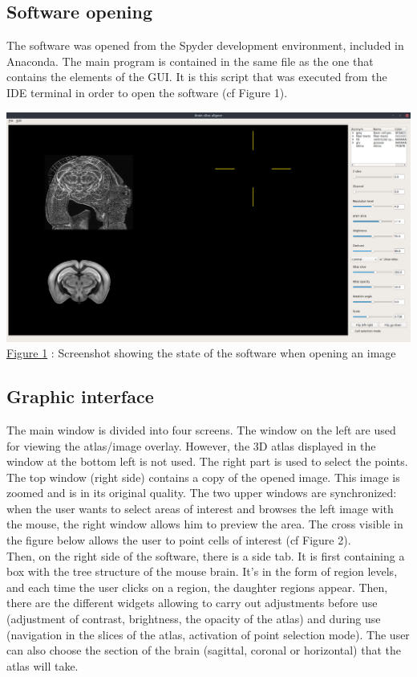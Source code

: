 \documentclass[a4paper,12pt]{report}
\begin{document}
\subsection{Software opening}
The software was opened from the Spyder development environment, included in Anaconda. The main program is contained in the same file as the one that contains the elements of the GUI. It is this script that was executed from the IDE terminal in order to open the software (cf Figure 1). 

\begin{center} \includegraphics[scale=0.25]{oldWhenOpenImage.png}\\
\underline{Figure 1} : Screenshot showing the state of the software when opening an image \\ \vspace{1\baselineskip} \end{center}

\subsection{Graphic interface}
The main window is divided into four screens. The window on the left are used for viewing the atlas/image overlay. However, the 3D atlas displayed in the window at the bottom left is not used. The right part is used to select the points. The top window (right side) contains a copy of the opened image. This image is zoomed and is in its original quality. The two upper windows are synchronized: when the user wants to select areas of interest and browses the left image with the mouse, the right window allows him to preview the area. The cross visible in the figure below allows the user to point cells of interest (cf Figure 2).\\

Then, on the right side of the software, there is a side tab. It is first containing a box with the tree structure of the mouse brain. It's in the form of region levels, and each time the user clicks on a region, the daughter regions appear. Then, there are the different widgets allowing to carry out adjustments before use (adjustment of contrast, brightness, the opacity of the atlas) and during use (navigation in the slices of the atlas, activation of point selection mode). The user can also choose the section of the brain (sagittal, coronal or horizontal) that the atlas will take.\\
\end{document}
